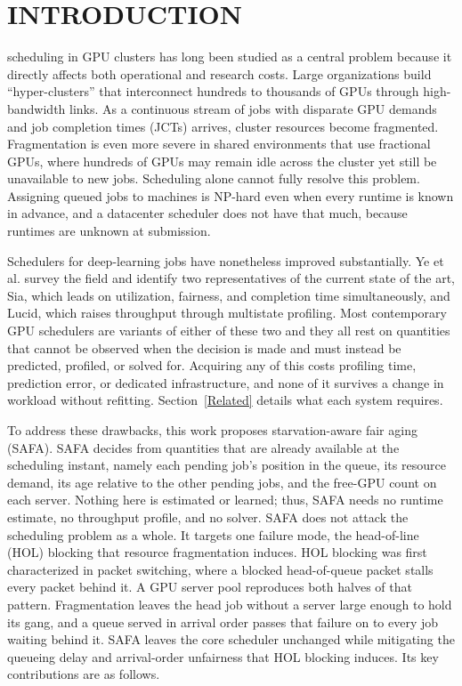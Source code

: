 \documentclass{ieeetj}
\begin{document}
\maketitle


\section{INTRODUCTION}\label{sec1}
 scheduling in GPU clusters has long been studied as a central problem because it directly affects both operational and research costs. Large organizations build ``hyper-clusters'' that interconnect hundreds to thousands of GPUs through high-bandwidth links. As a continuous stream of jobs with disparate GPU demands and job completion times (JCTs) arrives, cluster resources become fragmented\cite{athlur2022varuna}. Fragmentation is even more severe in shared environments that use fractional GPUs, where hundreds of GPUs may remain idle across the cluster yet still be unavailable to new jobs\cite{weng2023beware}. Scheduling alone cannot fully resolve this problem. Assigning queued jobs to machines is NP-hard even when every runtime is known in advance\cite{ullman1975np,b1}, and a datacenter scheduler does not have that much, because runtimes are unknown at submission\cite{b2}.

Schedulers for deep-learning jobs have nonetheless improved substantially. Ye et al.\cite{b3} survey the field and identify two representatives of the current state of the art, Sia\cite{b4}, which leads on utilization, fairness, and completion time simultaneously, and Lucid\cite{b5}, which raises throughput through multistate profiling. Most contemporary GPU schedulers are variants of either of these two and they all rest on quantities that cannot be observed when the decision is made and must instead be predicted, profiled, or solved for. Acquiring any of this costs profiling time, prediction error, or dedicated infrastructure, and none of it survives a change in workload without refitting. Section~\ref{Related} details what each system requires.

To address these drawbacks, this work proposes starvation-aware fair aging (SAFA). SAFA decides from quantities that are already available at the scheduling instant, namely each pending job's position in the queue, its resource demand, its age relative to the other pending jobs, and the free-GPU count on each server. Nothing here is estimated or learned; thus, SAFA needs no runtime estimate, no throughput profile, and no solver. SAFA does not attack the scheduling problem as a whole. It targets one failure mode, the head-of-line (HOL) blocking\cite{karol1987hol} that resource fragmentation induces. HOL blocking was first characterized in packet switching, where a blocked head-of-queue packet stalls every packet behind it. A GPU server pool reproduces both halves of that pattern. Fragmentation leaves the head job without a server large enough to hold its gang, and a queue served in arrival order passes that failure on to every job waiting behind it. SAFA leaves the core scheduler unchanged while mitigating the queueing delay and arrival-order unfairness that HOL blocking induces. Its key contributions are as follows.
\end{document}
